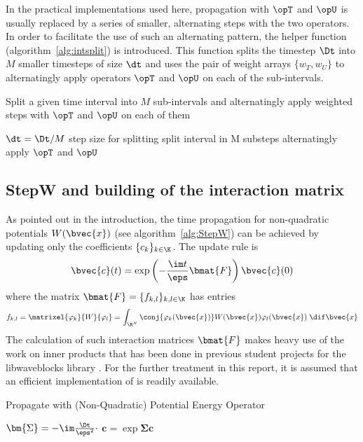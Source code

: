 %
In the practical implementations used here, propagation with $\opT$ and $\opU$ is usually replaced by a series of smaller, alternating steps with the two operators.
In order to facilitate the use of such an alternating pattern, the helper function  (algorithm~\ref{alg:intsplit}) is introduced.
This function splits the timestep $\Dt$ into $M$ smaller timesteps of size $\dt$ and uses the pair of weight arrays $\{ w_T, w_U \}$ to alternatingly apply operators $\opT$ and $\opU$ on each of the sub-intervals.
%
\begin{algorithm}[h]
	\caption{Split a given time interval into $M$ sub-intervals and alternatingly apply weighted steps with $\opT$ and $\opU$ on each of them}
	\label{alg:intsplit}
	\begin{algorithmic}
		\State
			\State
			\State $\dt = \Dt/M$
			\Comment step size for splitting
			\Comment split interval in M substeps
				\Comment alternatingly apply $\opT$ and $\opU$
					\State {}
					\State {}
				\EndFor
			\EndFor
		\State
		\EndProcedure
	\end{algorithmic}
\end{algorithm}


\subsection{StepW and building of the interaction matrix}
%
As pointed out in the introduction, the time propagation for non-quadratic potentials $W(\bvec{x})$ (see algorithm~\ref{alg:StepW}) can be achieved by updating only the coefficients $\{ c_k \}_{k \in \K}$.
The update rule is
%
\begin{align}
	\bvec{c}(t) = \exp \left( - \frac{\im t}{\eps} \bmat{F} \right) \bvec{c}(0)
\end{align}
%
where the matrix $\bmat{F} = \{ f_{k,l} \}_{k,l \in \K}$ has entries
%
\begin{align}
	f_{k,l} = \matrixel{\varphi_k}{W}{\varphi_l}
	= \int_{\R^N} \conj{\varphi_k(\bvec{x})} W(\bvec{x}) \varphi_l(\bvec{x}) \; \dif \bvec{x}
\end{align}
%
The calculation of such interaction matrices $\bmat{F}$ makes heavy use of the work on inner products that has been done in previous student projects for the libwaveblocks library \cite{libwaveblocks}.
For the further treatment in this report, it is assumed that an efficient implementation of  is readily available.
%
\begin{algorithm}[h]
	\caption{Propagate with (Non-Quadratic) Potential Energy Operator}
	\label{alg:StepW}
	\begin{algorithmic}
		\State
		\Procedure{StepW}{$\upic,\Dt$}
			\State $\bm{\Sigma} = - \im \frac{\Dt}{\eps^2} \cdot$ \Call{BuildF}{$\Pi$}
			\State $\bm{c} = \exp{\bm{\Sigma}} \bm{c}$
		\EndProcedure
		\State
	\end{algorithmic}
\end{algorithm}
